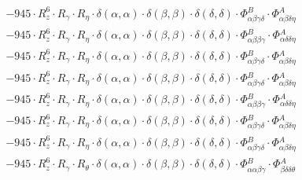 \documentclass{article}
\begin{document}
\begin{subequations}
\begin{gather}
\begin{array}{c}
 \\[0.2em] 		 - 945 \cdot R_{z}^{6} \cdot R_{\gamma{}} \cdot R_{\eta{}} \cdot \delta{}\left(\alpha{}, \alpha{}\right) \cdot \delta{}\left(\beta{}, \beta{}\right) \cdot \delta{}\left(\delta{}, \delta{}\right) \cdot \Phi{}^{B}_{\alpha{}\beta{}\gamma{}\delta{}} \cdot \Phi{}^{A}_{\alpha{}\beta{}\delta{}\eta{}} 
 \\[0.2em] 		 - 945 \cdot R_{z}^{6} \cdot R_{\gamma{}} \cdot R_{\eta{}} \cdot \delta{}\left(\alpha{}, \alpha{}\right) \cdot \delta{}\left(\beta{}, \beta{}\right) \cdot \delta{}\left(\delta{}, \delta{}\right) \cdot \Phi{}^{B}_{\alpha{}\beta{}\beta{}\gamma{}} \cdot \Phi{}^{A}_{\alpha{}\delta{}\delta{}\eta{}} 
 \\[0.2em] 		 - 945 \cdot R_{z}^{6} \cdot R_{\gamma{}} \cdot R_{\eta{}} \cdot \delta{}\left(\alpha{}, \alpha{}\right) \cdot \delta{}\left(\beta{}, \beta{}\right) \cdot \delta{}\left(\delta{}, \delta{}\right) \cdot \Phi{}^{B}_{\alpha{}\beta{}\gamma{}\delta{}} \cdot \Phi{}^{A}_{\alpha{}\beta{}\delta{}\eta{}} 
 \\[0.2em] 		 - 945 \cdot R_{z}^{6} \cdot R_{\gamma{}} \cdot R_{\eta{}} \cdot \delta{}\left(\alpha{}, \alpha{}\right) \cdot \delta{}\left(\beta{}, \beta{}\right) \cdot \delta{}\left(\delta{}, \delta{}\right) \cdot \Phi{}^{B}_{\alpha{}\beta{}\gamma{}\delta{}} \cdot \Phi{}^{A}_{\alpha{}\beta{}\delta{}\eta{}} 
 \\[0.2em] 		 - 945 \cdot R_{z}^{6} \cdot R_{\gamma{}} \cdot R_{\eta{}} \cdot \delta{}\left(\alpha{}, \alpha{}\right) \cdot \delta{}\left(\beta{}, \beta{}\right) \cdot \delta{}\left(\delta{}, \delta{}\right) \cdot \Phi{}^{B}_{\alpha{}\beta{}\beta{}\gamma{}} \cdot \Phi{}^{A}_{\alpha{}\delta{}\delta{}\eta{}} 
 \\[0.2em] 		 - 945 \cdot R_{z}^{6} \cdot R_{\gamma{}} \cdot R_{\eta{}} \cdot \delta{}\left(\alpha{}, \alpha{}\right) \cdot \delta{}\left(\beta{}, \beta{}\right) \cdot \delta{}\left(\delta{}, \delta{}\right) \cdot \Phi{}^{B}_{\alpha{}\beta{}\gamma{}\delta{}} \cdot \Phi{}^{A}_{\alpha{}\beta{}\delta{}\eta{}} 
 \\[0.2em] 		 - 945 \cdot R_{z}^{6} \cdot R_{\gamma{}} \cdot R_{\eta{}} \cdot \delta{}\left(\alpha{}, \alpha{}\right) \cdot \delta{}\left(\beta{}, \beta{}\right) \cdot \delta{}\left(\delta{}, \delta{}\right) \cdot \Phi{}^{B}_{\alpha{}\beta{}\gamma{}\delta{}} \cdot \Phi{}^{A}_{\alpha{}\beta{}\delta{}\eta{}} 
 \\[0.2em] 		 - 945 \cdot R_{z}^{6} \cdot R_{\gamma{}} \cdot R_{\theta{}} \cdot \delta{}\left(\alpha{}, \alpha{}\right) \cdot \delta{}\left(\beta{}, \beta{}\right) \cdot \delta{}\left(\delta{}, \delta{}\right) \cdot \Phi{}^{B}_{\alpha{}\alpha{}\beta{}\gamma{}} \cdot \Phi{}^{A}_{\beta{}\delta{}\delta{}\theta{}} 

\end{array}
\end{gather}
\end{subequations}
\end{document}
